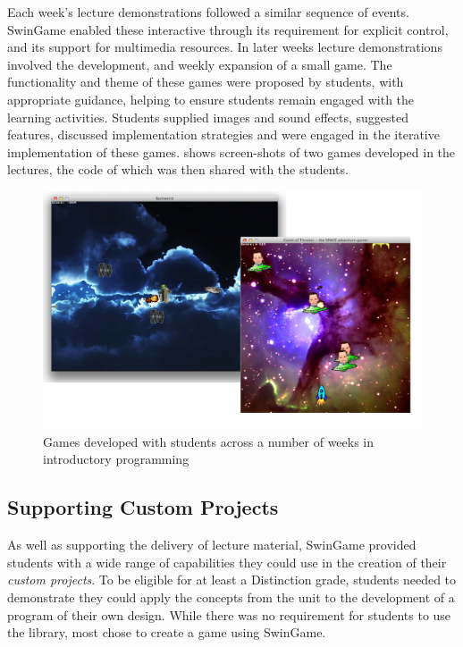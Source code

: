 Each week's lecture demonstrations followed a similar sequence of events. SwinGame enabled these interactive through its requirement for explicit control, and its support for multimedia resources. In later weeks lecture demonstrations involved the development, and weekly expansion of a small game. The functionality and theme of these games were proposed by students, with appropriate guidance, helping to ensure students remain engaged with the learning activities. Students supplied images and sound effects, suggested features, discussed implementation strategies and were engaged in the iterative implementation of these games.  shows screen-shots of two games developed in the lectures, the code of which was then shared with the students.

\begin{figure}[thbp]
  \centering
  \includegraphics[width=\textwidth]{Games}
  \caption{Games developed with students across a number of weeks in introductory programming}
  \label{fig:games}
\end{figure}


\subsection{Supporting Custom Projects} %
\label{sub:supporting_custom_projects}

As well as supporting the delivery of lecture material, SwinGame provided students with a wide range of capabilities they could use in the creation of their \emph{custom projects}. To be eligible for at least a Distinction grade, students needed to demonstrate they could apply the concepts from the unit to the development of a program of their own design. While there was no requirement for students to use the library, most chose to create a game using SwinGame.

